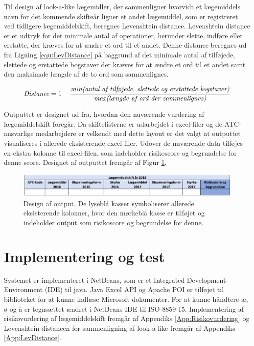 Til design af look-a-like lægemidler, der sammenligner hvorvidt et lægemiddels navn for det kommende skifteår ligner et andet lægemiddel, som er registreret ved tidligere lægemiddelskift, beregnes Levenshtein distance. Levenshtein distance er et udtryk for det minimale antal af operationer, herunder slette, indføre eller erstatte, der kræves for at ændre et ord til et andet. Denne distance beregnes ud fra Ligning \ref{equ:LevDistance} på baggrund af det minimale antal af tilføjede, slettede og erstattede bogstaver der kræves for at ændre et ord til et andet samt den maksimale længde af de to ord som sammenlignes. 

\begin{equation} \label{equ:LevDistance}
\mbox{\textit{Distance}} = 1 - \frac{\mbox{\textit{min(antal af tilføjede, slettede og erstattede bogstaver)}}}{\mbox{\textit{max(længde af ord der sammenlignes)}}}   
\end{equation}

Outputtet er designet ud fra, hvordan den nuværende vurdering af lægemiddelskift foregår. Da skiftelisterne er udarbejdet i excel-filer og de ATC-ansvarlige medarbejdere er velkendt med dette layout er det valgt at outputtet visualiseres i allerede eksisterende excel-filer. Udover de nuværende data tilføjes en ekstra kolonne til excel-filen, som indeholder risikoscore og begrundelse for denne score. Designet af outputtet fremgår af Figur \ref{fig:Output}.

\begin{figure}[H]\centering
\includegraphics[width=1\textwidth]{billeder/Output.png} 
	\caption{Design af output. De lyseblå kasser symboliserer allerede eksisterende kolonner, hvor den mørkeblå kasse er tilføjet og indeholder output som risikoscore og begrundelse for denne.}
	\label{fig:Output}  
\end{figure}

\newpage
\section{Implementering og test}
Systemet er implementeret i NetBeans, som er et Integrated Development Environment (IDE) til java.  Java Excel API og Apache POI er tilføjet til biblioteket for at kunne indlæse Microsoft dokumenter. For at kunne håndtere æ, ø og å er tegnsættet ændret i NetBeans IDE til ISO-8859-15. Implementering af risikovurdering af lægemiddelskift fremgår af Appendiks \ref{App:Risikovurdering} og Levenshtein distancen for sammenligning af look-a-like fremgår af Appendiks \ref{App:LevDistance}.

